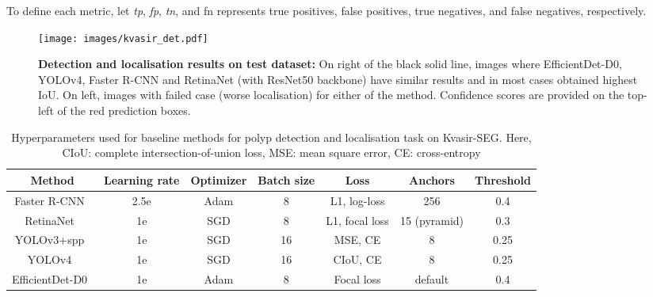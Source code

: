 \documentclass[journal]{IEEEtran}
\begin{document}
To define each metric, let \textit{tp}, \textit{fp}, \textit{tn}, and fn represents true positives, false positives, true negatives, and false negatives, respectively. 












\begin{figure*} 
    \centering
    \texttt{[image: images/kvasir\_det.pdf]}
    \caption{\textbf{Detection and localisation results on test dataset:} On right of the black solid line, images where EfficientDet-D0, YOLOv4, Faster R-CNN and RetinaNet (with ResNet50 backbone) have similar results and in most cases obtained highest IoU. On left, images with failed case (worse localisation) for either of the method. Confidence scores are provided on the top-left of the red prediction boxes.}
    \label{fig:detection}
\end{figure*}

\begin{table*}[t!]
\centering

\caption{{{Hyperparameters used for baseline methods for polyp detection and localisation task on Kvasir-SEG. Here,  CIoU: complete intersection-of-union loss, MSE: mean square error, CE: cross-entropy}}}   
\def\arraystretch{1.2}
\label{table:parametersuseddetection}
\begin{tabular}{c|c|c|c|c|c|c}
\toprule
\textbf{Method}  &\textbf{Learning rate} & \textbf{Optimizer} & \textbf{Batch size} & \textbf{Loss} & \textbf{Anchors} & \textbf{Threshold}\\ \midrule
Faster R-CNN~\cite{ren2015faster}    & 2.5e  & Adam  &  8 &  L1, log-loss  & 256 &  0.4 \\ \hline
RetinaNet~\cite{lin2017focal}   & 1e &  SGD & 8  & L1, focal loss  &  15 (pyramid) & 0.3  \\ \hline
YOLOv3+spp~\cite{redmon2018yolov3}    &  1e  & SGD  & 16  & MSE, 
CE  & 8 & 0.25  \\ \hline 
YOLOv4~\cite{bochkovskiy2020yolov4}   &   1e & SGD  & 16  & CIoU, CE    & 8 & 0.25  \\ \hline
EfficientDet-D0~\cite{tan2020efficientdet} & 1e   & Adam  & 8  & Focal loss & default & 0.4  \\ 
\bottomrule
\end{tabular}
\end{table*}
\end{document}

